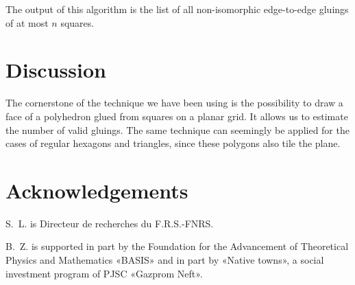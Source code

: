 \documentclass[a4paper,11pt]{article}
\begin{document}
The output of this algorithm is the list of all non-isomorphic edge-to-edge gluings of at most $n$ squares.

\section{Discussion}

The cornerstone of the technique we have been using is the possibility to draw a face of a polyhedron glued from squares on a planar grid. It allows us to estimate the number of valid gluings. The same technique can seemingly be applied for the cases of regular hexagons and triangles, since these polygons also tile the plane.

\section*{Acknowledgements}

S.~L. is Directeur de recherches du F.R.S.-FNRS.

B.~Z. is supported in part by the Foundation for the Advancement of Theoretical Physics and Mathematics «BASIS» and in part by «Native towns», a social investment program of PJSC «Gazprom Neft».

{}

\end{document}
